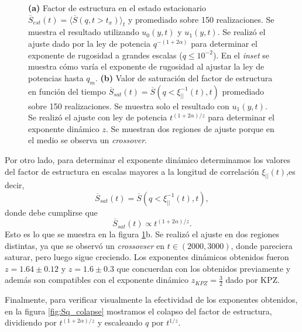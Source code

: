 \begin{figure}[!t]
\begin{subfigure}{0.55\textwidth}
    \caption{}
\end{subfigure}
    \caption[Factor de estructura estacionario $\overline{S}_{est}(t)$ y de saturación $\overline{S}_{sat}(t)$ de la interfaz de infectados]{\textbf{(a)} Factor de estructura en el estado estacionario $\overline{S}_{est}(t)=\langle \overline{S}(q,t>t_x)\rangle_t$ y promediado sobre 150 realizaciones. Se muestra el resultado utilizando $u_0(y,t)$ y $u_1(y,t)$. Se realizó el ajuste dado por la ley de potencia $q^{-(1+2\alpha)}$ para determinar el exponente de rugosidad a grandes escalas ($q \le 10^{-2}$). En el \textit{inset} se muestra cómo varía el exponente de rugosidad al ajustar la ley de potencias hasta $q_m$. \textbf{(b)} Valor de saturación del factor de estructura en función del tiempo $\overline{S}_{sat}(t) = \overline{S}(q<\xi^{-1}_{||}(t),t)$ promediado sobre 150 realizaciones. Se muestra solo el resultado con $u_1(y,t)$. Se realizó el ajuste con ley de potencia $t^{(1+2\alpha)/z}$ para determinar el exponente dinámico $z$. Se muestran dos regiones de ajuste porque en el medio se observa un \textit{crossover}.}
    \label{fig:Sq_est_sat}
\end{figure}

Por otro lado, para determinar el exponente dinámico determinamos los valores del factor de estructura en escalas mayores a la longitud de correlación $\xi_{||}(t)$,es decir,
\begin{equation}
    \overline{S}_{sat}(t) = \overline{S}(q<\xi^{-1}_{||}(t),t),
\end{equation}
donde debe cumplirse que
\begin{equation}
    \overline{S}_{sat}(t) \propto t^{(1+2\alpha)/z}.
\end{equation}
Esto es lo que se muestra en la figura \ref{fig:Sq_est_sat}b. Se realizó el ajuste en dos regiones distintas, ya que se observó un \textit{crossovser} en $t\in(2000,3000)$, donde pareciera saturar, pero luego sigue creciendo. Los exponentes dinámicos obtenidos fueron $z = 1.64 \pm 0.12$ y $z = 1.6 \pm 0.3$ que concuerdan con los obtenidos previamente y además son compatibles con el exponente dinámico $z_{KPZ} = \frac{3}{2}$ dado por KPZ.

Finalmente, para verificar visualmente la efectividad de los exponentes obtenidos, en la figura \ref{fig:Sq_colapse} mostramos el colapso del factor de estructura, dividiendo por $t^{(1+2\alpha)/z}$ y escaleando $q$ por $t^{1/z}$.

